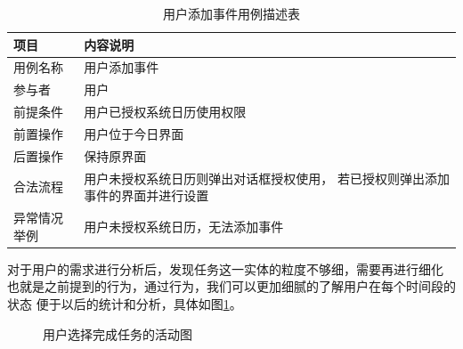 \begin{table}
	\centering
	\caption{用户添加事件用例描述表}
	\begin{tabular}{l|p{8cm}} \toprule
	  项目 & 内容说明 \\
	  \midrule
	  用例名称 & 用户添加事件 \\
	  参与者 & 用户 \\
	  前提条件 & 用户已授权系统日历使用权限 \\
	  前置操作 & 用户位于今日界面 \\
	  后置操作 & 保持原界面 \\
	  合法流程 & 用户未授权系统日历则弹出对话框授权使用，
	  若已授权则弹出添加事件的界面并进行设置 \\
	  异常情况举例 & 用户未授权系统日历，无法添加事件 \\
	  \bottomrule
	\end{tabular}
\end{table}

对于用户的需求进行分析后，发现任务这一实体的粒度不够细，需要再进行细化
也就是之前提到的行为，通过行为，我们可以更加细腻的了解用户在每个时间段的状态
便于以后的统计和分析，具体如图\ref{fig:activity}。

\begin{figure}
	\centering
	\caption{用户选择完成任务的活动图}
    \label{fig:activity}
\end{figure}

